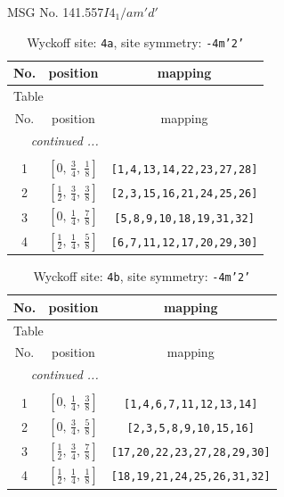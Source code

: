 \documentclass[fleqn,8pt]{jsarticle}
\begin{document}
\setcounter{MaxMatrixCols}{32}

\renewcommand{\tablename}{Table~}
\renewcommand{\figurename}{Figure~}
\begin{center}
\LARGE
MSG No. 141.557\quad$I4_{1}/am'd'$
\end{center}
\renewcommand{\arraystretch}{1.2}
\begin{longtable}{ccc}
\caption{Wyckoff site: {\tt 4a}, site symmetry: {\tt -4m'2'}}
 \\
 \hline \hline
No. & position & mapping \\ \hline \endfirsthead

\multicolumn{2}{l}{\tablename\ \thetable{}} \\
 \hline \hline
No. & position & mapping \\ \hline \endhead

 \hline \hline
\multicolumn{2}{r}{\footnotesize\it continued ...} \\ \endfoot

 \hline \hline
\multicolumn{2}{r}{} \\ \endlastfoot

1 & $\left[ 0,\, \frac{3}{4},\, \frac{1}{8} \right]$ & {\tt [1,4,13,14,22,23,27,28]} \\ \hline
2 & $\left[ \frac{1}{2},\, \frac{3}{4},\, \frac{3}{8} \right]$ & {\tt [2,3,15,16,21,24,25,26]} \\ \hline
3 & $\left[ 0,\, \frac{1}{4},\, \frac{7}{8} \right]$ & {\tt [5,8,9,10,18,19,31,32]} \\ \hline
4 & $\left[ \frac{1}{2},\, \frac{1}{4},\, \frac{5}{8} \right]$ & {\tt [6,7,11,12,17,20,29,30]} \\
\end{longtable}
\renewcommand{\arraystretch}{1.2}
\begin{longtable}{ccc}
\caption{Wyckoff site: {\tt 4b}, site symmetry: {\tt -4m'2'}}
 \\
 \hline \hline
No. & position & mapping \\ \hline \endfirsthead

\multicolumn{2}{l}{\tablename\ \thetable{}} \\
 \hline \hline
No. & position & mapping \\ \hline \endhead

 \hline \hline
\multicolumn{2}{r}{\footnotesize\it continued ...} \\ \endfoot

 \hline \hline
\multicolumn{2}{r}{} \\ \endlastfoot

1 & $\left[ 0,\, \frac{1}{4},\, \frac{3}{8} \right]$ & {\tt [1,4,6,7,11,12,13,14]} \\ \hline
2 & $\left[ 0,\, \frac{3}{4},\, \frac{5}{8} \right]$ & {\tt [2,3,5,8,9,10,15,16]} \\ \hline
3 & $\left[ \frac{1}{2},\, \frac{3}{4},\, \frac{7}{8} \right]$ & {\tt [17,20,22,23,27,28,29,30]} \\ \hline
4 & $\left[ \frac{1}{2},\, \frac{1}{4},\, \frac{1}{8} \right]$ & {\tt [18,19,21,24,25,26,31,32]} \\
\end{longtable}
\end{document}
